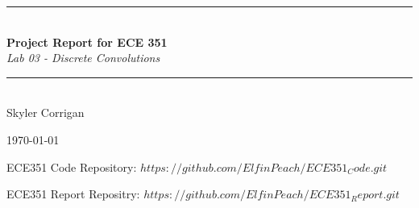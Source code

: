 \documentclass[12pt,a4paper]{article}
\newcommand{\HRule}{\rule{\linewidth}{0.5mm}}
\begin{document}
\begin{titlepage}
\begin{center}



\HRule \\[0.4cm]
{ \LARGE 
  \textbf{Project Report for ECE 351}\\[0.4cm]
  \emph{Lab 03 - Discrete Convolutions}\\[0.4cm]
}
\HRule \\[1.5cm]



{ \large
  Skyler Corrigan \\[0.1cm]
}

\vfill



{\large \today}

{ \large
ECE351 Code Repository: 
\hyperlink{$https://github.com/ElfinPeach/ECE351_Code.git$}{$https://github.com/ElfinPeach/ECE351_Code.git$}

ECE351 Report Repositry: 
\hyperlink{$https://github.com/ElfinPeach/ECE351_Report.git$}{$https://github.com/ElfinPeach/ECE351_Report.git$}
}
 
\end{center}
\end{titlepage}


\newpage



\tableofcontents
{}
\newpage
\setcounter{page}{1}

\end{document}
